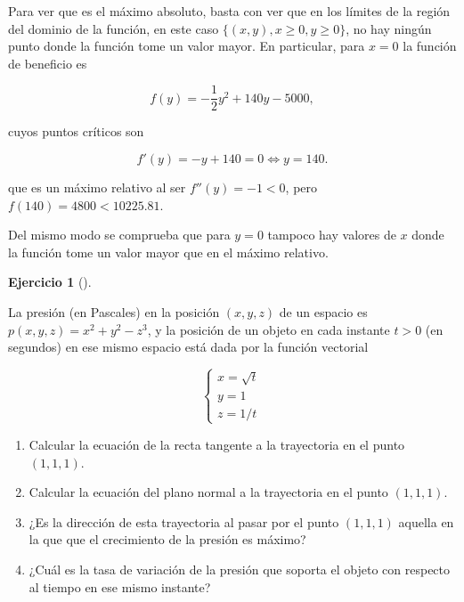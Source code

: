 \documentclass[
  a4paper,
]{scrreport}
\theoremstyle{definition}
\newtheorem{exercise}{Ejercicio}[chapter]
\theoremstyle{remark}
\begin{document}
\begin{tcolorbox}
Para ver que es el máximo absoluto, basta con ver que en los límites de
la región del dominio de la función, en este caso
\(\{(x,y), x\geq 0, y\geq 0\}\), no hay ningún punto donde la función
tome un valor mayor. En particular, para \(x=0\) la función de beneficio
es

\[
f(y) = -\frac{1}{2}y^2 + 140y - 5000,
\]

cuyos puntos críticos son

\[
f'(y) = -y + 140 = 0 \Leftrightarrow y = 140.
\]

que es un máximo relativo al ser \(f''(y) = -1<0\), pero
\(f(140) = 4800 < 10225.81\).

Del mismo modo se comprueba que para \(y=0\) tampoco hay valores de
\(x\) donde la función tome un valor mayor que en el máximo relativo.

\end{tcolorbox}

\begin{exercise}[]\protect\hypertarget{exr-2}{}\label{exr-2}

La presión (en Pascales) en la posición \((x,y,z)\) de un espacio es
\(p(x,y,z)= x^2+y^2-z^3\), y la posición de un objeto en cada instante
\(t>0\) (en segundos) en ese mismo espacio está dada por la función
vectorial

\[
\begin{cases}
x=\sqrt{t}\\
y=1\\
z=1/t
\end{cases}
\]

\begin{enumerate}
\def\labelenumi{\alph{enumi}.}
\item
  Calcular la ecuación de la recta tangente a la trayectoria en el punto
  \((1,1,1)\).
\item
  Calcular la ecuación del plano normal a la trayectoria en el punto
  \((1,1,1)\).
\item
  ¿Es la dirección de esta trayectoria al pasar por el punto \((1,1,1)\)
  aquella en la que que el crecimiento de la presión es máximo?
\item
  ¿Cuál es la tasa de variación de la presión que soporta el objeto con
  respecto al tiempo en ese mismo instante?
\end{enumerate}

\end{exercise}
\end{document}
